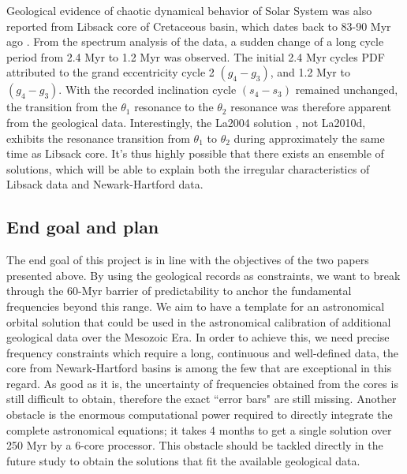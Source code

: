 \documentclass[12pt]{article}
\begin{document}
	Geological evidence of chaotic dynamical behavior of Solar System was also reported from Libsack core of Cretaceous basin, which dates back to 83-90 Myr ago \citep{ma2017}. From the spectrum analysis of the data, a sudden change of a long cycle period from 2.4 Myr to 1.2 Myr was observed. The initial 2.4 Myr cycles PDF attributed to the grand eccentricity cycle 2 $(g_4-g_3)$, and 1.2 Myr to $(g_4-g_3)$. With the recorded inclination cycle $(s_4-s_3)$ remained unchanged, the transition from the $\theta_1$ resonance to the $\theta_2$ resonance was therefore apparent from the geological data. Interestingly, the La2004 solution \citep{laskar2004}, not La2010d, exhibits the resonance transition from $\theta_1$ to $\theta_2 $  during approximately the same time as Libsack core. It's thus highly possible that there exists an ensemble of solutions, which will be able to explain both the irregular characteristics of Libsack data and Newark-Hartford data.
	
	\subsection{End goal and plan}
	The end goal of this project is in line with the objectives of the two papers presented above. By using the geological records as constraints, we want to break through the 60-Myr barrier of predictability to anchor the fundamental frequencies beyond this range. We aim to have a template for an astronomical orbital solution that could be used in the astronomical calibration of additional geological data over the Mesozoic Era. In order to achieve this, we need precise frequency constraints which require a long, continuous and well-defined data, the core from Newark-Hartford basins is among the few that are exceptional in this regard. As good as it is, the uncertainty of frequencies obtained from the cores is still difficult to obtain, therefore the exact ``error bars" are still missing. Another obstacle is the enormous computational power required to directly integrate the complete astronomical equations; it takes 4 months to get a single solution over 250 Myr by a 6-core processor. This obstacle should be tackled directly in the future study to obtain the solutions that fit the available geological data.
	
\end{document}
